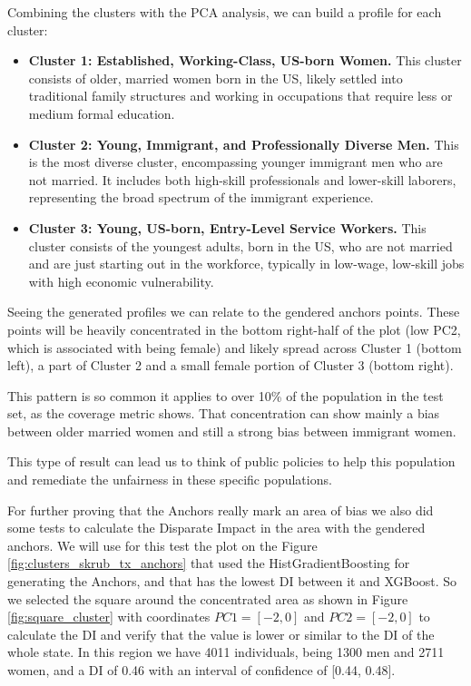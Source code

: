 Combining the clusters with the PCA analysis, we can build a profile for each cluster:

\begin{itemize}
    \item \textbf{Cluster 1: Established, Working-Class, US-born Women.} This cluster consists of older, married women born in the US, likely settled into traditional family structures and working in occupations that require less or medium formal education.
    
    \item \textbf{Cluster 2: Young, Immigrant, and Professionally Diverse Men.} This is the most diverse cluster, encompassing younger immigrant men who are not married. It includes both high-skill professionals and lower-skill laborers, representing the broad spectrum of the immigrant experience.

    \item \textbf{Cluster 3: Young, US-born, Entry-Level Service Workers.} This cluster consists of the youngest adults, born in the US, who are not married and are just starting out in the workforce, typically in low-wage, low-skill jobs with high economic vulnerability.
\end{itemize}

Seeing the generated profiles we can relate to the gendered anchors points. These points will be heavily concentrated in the bottom right-half of the plot (low PC2, which is associated with being female) and likely spread across Cluster 1 (bottom left), a part of Cluster 2 and a small female portion of Cluster 3 (bottom right).

This pattern is so common it applies to over 10\% of the population in the test set, as the coverage metric shows. That concentration can show mainly a bias between older married women and still a strong bias between immigrant women.

This type of result can lead us to think of public policies to help this population and remediate the unfairness in these specific populations.

For further proving that the Anchors really mark an area of bias we also did some tests to calculate the Disparate Impact in the area with the gendered anchors. We will use for this test the plot on the Figure \ref{fig:clusters_skrub_tx_anchors} that used the HistGradientBoosting for generating the Anchors, and that has the lowest DI between it and XGBoost.
So we selected the square around the concentrated area as shown in Figure \ref{fig:square_cluster} with coordinates $PC1 = [-2, 0]$ and $PC2 = [-2, 0]$ to calculate the DI and verify that the value is lower or similar to the DI of the whole state. In this region we have 4011 individuals, being 1300 men and 2711 women, and a DI of 0.46 with an interval of confidence of [0.44, 0.48].

